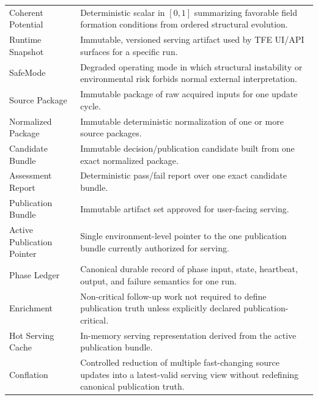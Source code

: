 \documentclass[11pt]{report}
\begin{document}
\begin{longtable}{p{}p{}}
Coherent Potential & Deterministic scalar in $[0,1]$ summarizing favorable field formation conditions from ordered structural evolution. \\
Runtime Snapshot & Immutable, versioned serving artifact used by TFE UI/API surfaces for a specific run. \\
SafeMode & Degraded operating mode in which structural instability or environmental risk forbids normal external interpretation. \\
Source Package & Immutable package of raw acquired inputs for one update cycle. \\
Normalized Package & Immutable deterministic normalization of one or more source packages. \\
Candidate Bundle & Immutable decision/publication candidate built from one exact normalized package. \\
Assessment Report & Deterministic pass/fail report over one exact candidate bundle. \\
Publication Bundle & Immutable artifact set approved for user-facing serving. \\
Active Publication Pointer & Single environment-level pointer to the one publication bundle currently authorized for serving. \\
Phase Ledger & Canonical durable record of phase input, state, heartbeat, output, and failure semantics for one run. \\
Enrichment & Non-critical follow-up work not required to define publication truth unless explicitly declared publication-critical. \\
Hot Serving Cache & In-memory serving representation derived from the active publication bundle. \\
Conflation & Controlled reduction of multiple fast-changing source updates into a latest-valid serving view without redefining canonical publication truth. \\
\bottomrule
\end{longtable}
\end{document}
